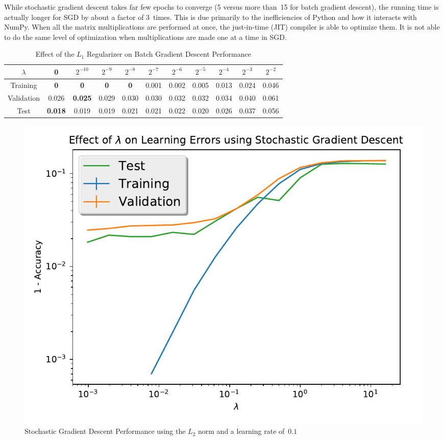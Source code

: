 \documentclass{report}
\begin{document}
  While stochastic gradient descent takes far few epochs to converge (5 versus more than~15 for batch gradient descent), the running time is actually longer for SGD by about a factor of 3~times.  This is due primarily to the inefficiencies of Python and how it interacts with NumPy.  When all the matrix multiplications are performed at once, the just-in-time (JIT) compiler is able to optimize them.  It is not able to do the same level of optimization when multiplications are made one at a time in SGD.
  
    \begin{table}[]
    \centering
    \caption{Effect of the $L_1$ Regularizer on Batch Gradient Descent Performance}
    \label{tab:stochasticGradientDescentL2}
    \begin{tabular}{c||c|c|c|c|c|c|c|c|c|c}
      \hline
      $\lambda$  & 0              & $2^{-10}$ & $2^{-9}$ & $2^{-8}$       & $2^{-7}$ & $2^{-6}$ & $2^{-5}$ & $2^{-4}$ & $2^{-3}$ & $2^{-2}$ \\ \hline
      Training   & \textbf{0}  & \textbf{0}    & \textbf{0}    & \textbf{0} & 0.001   & 0.002    & 0.005    & 0.013    & 0.024    & 0.046    \\ \hline
      Validation & 0.026 & \textbf{0.025}    & 0.029  & 0.030 & 0.030    & 0.032    & 0.032    & 0.034    & 0.040    & 0.061    \\ \hline
      Test       & \textbf{0.018} & 0.019     & 0.019    & 0.021          & 0.021    & 0.022    & 0.020    & 0.026    & 0.037    & 0.056    \\ \hline
    \end{tabular}
  \end{table}
  
  \begin{figure}
    \centering
    \includegraphics[scale=.5]{stochastic_GD_L2Norm}
    \caption{Stochastic Gradient Descent Performance using the $L_{2}$ norm and a learning rate of~$0.1$}\label{fig:stochasticGDL2}
  \end{figure}
  
  
\end{document}

